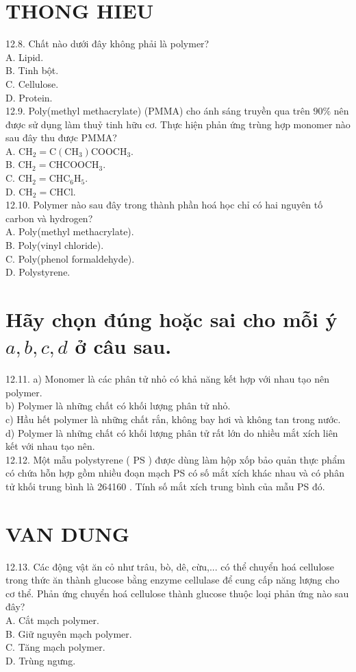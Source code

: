 \documentclass[10pt]{article}
\begin{document}
\section*{THONG HIEU}
12.8. Chất nào dưới đây không phải là polymer?\\
A. Lipid.\\
B. Tinh bột.\\
C. Cellulose.\\
D. Protein.\\
12.9. Poly(methyl methacrylate) (PMMA) cho ánh sáng truyền qua trên $90 \%$ nên được sử dụng làm thuỷ tinh hữu cơ. Thực hiện phản ứng trùng hợp monomer nào sau đây thu được PMMA?\\
A. $\mathrm{CH}_{2}=\mathrm{C}\left(\mathrm{CH}_{3}\right) \mathrm{COOCH}_{3}$.\\
B. $\mathrm{CH}_{2}=\mathrm{CHCOOCH}_{3}$.\\
C. $\mathrm{CH}_{2}=\mathrm{CHC}_{6} \mathrm{H}_{5}$.\\
D. $\mathrm{CH}_{2}=\mathrm{CHCl}$.\\
12.10. Polymer nào sau đây trong thành phần hoá học chỉ có hai nguyên tố carbon và hydrogen?\\
A. Poly(methyl methacrylate).\\
B. Poly(vinyl chloride).\\
C. Poly(phenol formaldehyde).\\
D. Polystyrene.

\section*{Hãy chọn đúng hoặc sai cho mỗi ý $a, b, c, d$ ở câu sau.}
12.11. a) Monomer là các phân tử nhỏ có khả năng kết hợp với nhau tạo nên polymer.\\
b) Polymer là những chất có khối lượng phân tử nhỏ.\\
c) Hầu hết polymer là những chất rắn, không bay hơi và không tan trong nước.\\
d) Polymer là những chất có khối lượng phân tử rất lớn do nhiều mắt xích liên kết với nhau tạo nên.\\
12.12. Một mẫu polystyrene ( PS ) được dùng làm hộp xốp bảo quản thực phẩm có chứa hỗn hợp gồm nhiều đoạn mạch PS có số mắt xích khác nhau và có phân tử khối trung bình là 264160 . Tính số mắt xích trung bình của mẫu PS đó.

\section*{VAN DUNG}
12.13. Các động vật ăn cỏ như trâu, bò, dê, cừu,... có thể chuyển hoá cellulose trong thức ăn thành glucose bằng enzyme cellulase để cung cấp năng lượng cho cơ thể. Phản ứng chuyển hoá cellulose thành glucose thuộc loại phản ứng nào sau đây?\\
A. Cắt mạch polymer.\\
B. Giữ nguyên mạch polymer.\\
C. Tăng mạch polymer.\\
D. Trùng ngưng.
\end{document}
